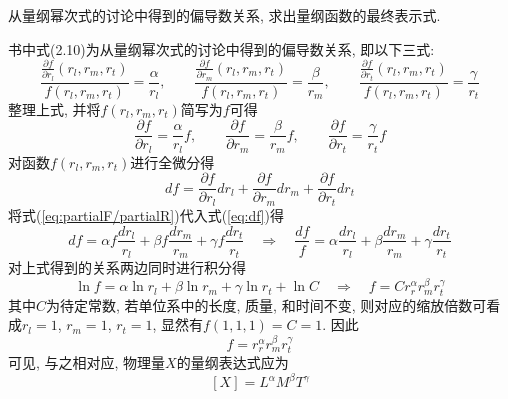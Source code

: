 \begin{problem}[06]
从量纲幂次式的讨论中得到的偏导数关系, 求出量纲函数的最终表示式.
\end{problem}
\begin{solution}
书\cite{tan_dimensional_2011}中式(2.10)为从量纲幂次式的讨论中得到的偏导数关系, 即以下三式:
\[
\frac{\frac{\partial f}{\partial r_l}(r_l, r_m, r_t)}{f(r_l, r_m, r_t)} = \frac{\alpha}{r_l}
, \qquad
\frac{\frac{\partial f}{\partial r_m}(r_l, r_m, r_t)}{f(r_l, r_m, r_t)} = \frac{\beta}{r_m}
, \qquad
\frac{\frac{\partial f}{\partial r_t}(r_l, r_m, r_t)}{f(r_l, r_m, r_t)} = \frac{\gamma}{r_t}
\]
整理上式, 并将$f(r_l, r_m, r_t)$简写为$f$可得
\begin{equation}\label{eq:partialF/partialR}
\frac{\partial f}{\partial r_l}= \frac{\alpha}{r_l}f
, \qquad
\frac{\partial f}{\partial r_m}= \frac{\beta}{r_m}f
, \qquad
\frac{\partial f}{\partial r_t}= \frac{\gamma}{r_t}f
\end{equation}
对函数$f(r_l, r_m, r_t)$进行全微分得
\begin{equation}\label{eq:df}
df = \frac{\partial f}{\partial r_l}dr_l + \frac{\partial f}{\partial r_m}dr_m + \frac{\partial f}{\partial r_t}dr_t
\end{equation}
将式(\ref{eq:partialF/partialR})代入式(\ref{eq:df})得
\begin{equation}
df = \alpha f \frac{dr_l}{r_l} + \beta f \frac{dr_m}{r_m} + \gamma f \frac{dr_t}{r_t} 
\quad \Longrightarrow \quad 
\frac{df}{f} = \alpha \frac{dr_l}{r_l} + \beta \frac{dr_m}{r_m} + \gamma \frac{dr_t}{r_t}
\end{equation}
对上式得到的关系两边同时进行积分得
\begin{equation}
\ln f = \alpha \ln r_l + \beta \ln r_m + \gamma \ln r_t + \ln C
\quad \Longrightarrow \quad 
f = C r_r^{\alpha} r_m^{\beta} r_t^{\gamma}
\end{equation}
其中$C$为待定常数, 若单位系中的长度, 质量, 和时间不变, 则对应的缩放倍数可看成$r_l=1$, $r_m=1$, $r_t=1$, 显然有$f(1,1,1) = C = 1$. 因此
\begin{equation}
f = r_r^{\alpha} r_m^{\beta} r_t^{\gamma}
\end{equation}
可见, 与之相对应, 物理量$X$的量纲表达式应为
\[
[X] = L^\alpha M^\beta T^\gamma
\]
\end{solution}
